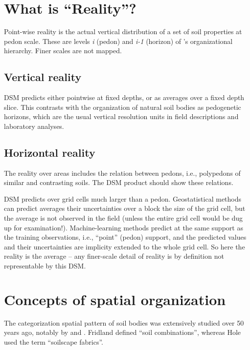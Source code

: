 \documentclass[soil, manuscript]{copernicus}
\begin{document}
\section{What is ``Reality''?}

\par
Point-wise reality is the actual vertical distribution of a set of soil properties at pedon scale.
%
These are levels \textit{i} (pedon) and \textit{i-1} (horizon) of \citet{Hoosbeekquantitativemodelingpedogenesis1992}'s organizational hierarchy.
%
Finer scales are not mapped.

\subsection{Vertical reality}

DSM predicts either pointwise at fixed depths, or as averages over a fixed depth slice.
%
This contrasts with the organization of natural soil bodies as pedogenetic horizons, which are the usual vertical resolution units in field descriptions and laboratory analyses.


\subsection{Horizontal reality}
%

\par
The reality over areas includes the relation between pedons, i.e., polypedons of similar and contrasting soils.
%
The DSM product should show these relations.
%

\par
DSM predicts over grid cells much larger than a pedon.
%
Geostatistical methods can predict averages their uncertainties over a block the size of the grid cell, but the average is not observed in the field (unless the entire grid cell would be dug up for examination!).
%
Machine-learning methods predict at the same support as the training observations, i.e., ``point'' (pedon) support, and the predicted values and their uncertainties are implicity extended to the whole grid cell.
%
So here the reality is the average -- any finer-scale detail of reality is by definition not representable by this DSM.

\section{Concepts of spatial organization}

\par
The categorization spatial pattern of soil bodies was extensively studied over 50 years ago, notably by \citet{Fridland1972,Fridland1974} and \citet{holeApproachLandscapeAnalysis1978, holeSoilLandscapeAnalysis1985}.
%
Fridland defined ``soil combinations'', whereas Hole used the term ``soilscape fabrics''.
%
\end{document}
